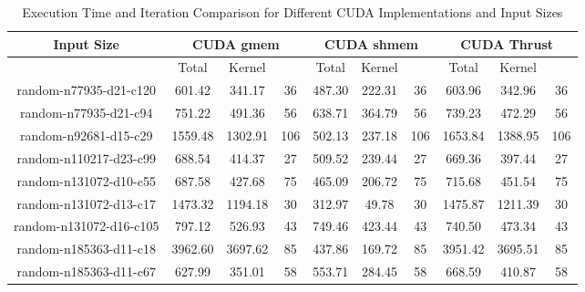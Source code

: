 \documentclass[letterpaper,12pt]{article}
\theoremstyle{remark}
\begin{document}
\clearpage

\begin{table}[ht]
\centering
\caption{Execution Time and Iteration Comparison for Different CUDA Implementations and Input Sizes}
\begin{tabular}{|c|c|c|c|c|c|c|c|c|c|}
\hline
\textbf{Input Size} & \multicolumn{3}{c|}{\textbf{CUDA gmem}} & \multicolumn{3}{c|}{\textbf{CUDA shmem}} & \multicolumn{3}{c|}{\textbf{CUDA Thrust}} \\
\hline
& Total & Kernel  &  & Total & Kernel &  & Total & Kernel &  \\
\hline
random-n77935-d21-c120 &  601.42 &  341.17 & 36 &  487.30 &  222.31 & 36 &  603.96 &  342.96 & 36 \\
random-n77935-d21-c94  &  751.22 &  491.36 & 56 &  638.71 &  364.79 & 56 &  739.23 &  472.29 & 56 \\
random-n92681-d15-c29  & 1559.48 & 1302.91 & 106 & 502.13 & 237.18 & 106 & 1653.84 & 1388.95 & 106 \\
random-n110217-d23-c99 &  688.54 &  414.37 & 27 &  509.52 &  239.44 & 27 &  669.36 &  397.44 & 27 \\
random-n131072-d10-c55 &  687.58 &  427.68 & 75 &  465.09 &  206.72 & 75 &  715.68 &  451.54 & 75 \\
random-n131072-d13-c17 & 1473.32 & 1194.18 & 30 &  312.97 &   49.78 & 30 & 1475.87 & 1211.39 & 30 \\
random-n131072-d16-c105&  797.12 &  526.93 & 43 &  749.46 &  423.44 & 43 &  740.50 &  473.34 & 43 \\
random-n185363-d11-c18 & 3962.60 & 3697.62 & 85 &  437.86 &  169.72 & 85 & 3951.42 & 3695.51 & 85 \\
random-n185363-d11-c67 &  627.99 &  351.01 & 58 &  553.71 &  284.45 & 58 &  668.59 &  410.87 & 58 \\

\hline
\end{tabular}
\end{table}
\end{document}
